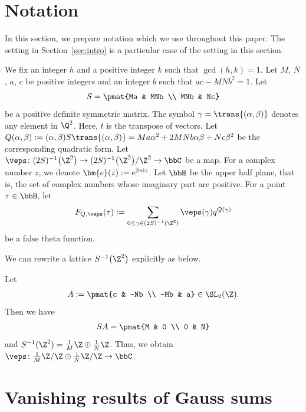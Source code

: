 \section{Notation} \label{sec:notation}


In this section, we prepare notation which we use throughout this paper.
The setting in Sec\-tion~\ref{sec:intro} is a particular case of the setting in this section.

We fix an integer $ h $ and a positive integer $ k $ such that $ \gcd(h, k) = 1 $.
Let $ M$, $N$, $a$, $c $ be positive integers and an integer $ b $ such that $ ac - MNb^2 = 1 $.
Let
\begin{gather*}
S = \pmat{Ma & MNb \\ MNb & Nc}
\end{gather*}
be a positive definite symmetric matrix.
The symbol $ \gamma = \trans{(\alpha, \beta)} $ denotes any element in $ \Q^2 $.
Here, $ t $ is the transpose of vectors.
Let $ Q(\alpha, \beta) := (\alpha, \beta) S \trans{(\alpha, \beta)} = Ma\alpha^2 + 2MNb \alpha \beta + Nc\beta^2 $ be the corresponding quadratic form.
Let $ \veps \colon (2S)^{-1}\big(\Z^2\big) \to (2S)^{-1}\big(\Z^2\big)/\Z^2 \to \bbC $ be a map.
For a complex number $ z $, we denote $ \bm{e}(z) := {\rm e}^{2\pi {\rm i} z} $.
Let $ \bbH $ be the upper half plane, that is, the set of complex numbers whose imaginary part are positive.
For a point $ \tau \in \bbH $, let {\samepage
\begin{gather*}
F_{Q, \veps}(\tau) := \sum_{0 \le \gamma \in (2S)^{-1}(\Z^2)} \veps(\gamma) q^{Q(\gamma)}
\end{gather*}
be a false theta function.}

We can rewrite a lattice $ S^{-1}\big(\Z^2\big) $ explicitly as below.
\begin{rem} \label{rem:S_inv_factor}
	Let
	\begin{gather*}
	A := \pmat{c & -Nb \\ -Mb & a} \in \SL_2(\Z).
	\end{gather*}
	Then we have
	\begin{gather*}
	SA = \pmat{M & 0 \\ 0 & N}
	\end{gather*}
	and $ S^{-1}(\Z^2) = \frac{1}{M}\Z \oplus \frac{1}{N}\Z $.
	Thus, we obtain $ \veps \colon \frac{1}{M}\Z/\Z \oplus \frac{1}{N}\Z/\Z \to \bbC $.
\end{rem}
\section{Vanishing results of Gauss sums} \label{sec:Gauss_sum}

